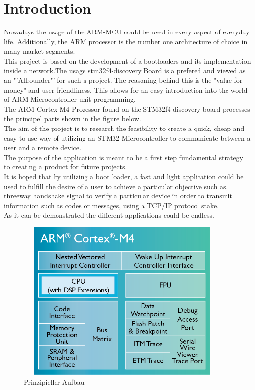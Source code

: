 \chapter{Introduction}
 
Nowadays the usage of the ARM-MCU could be used in every aspect of everyday life.
Additionally, the ARM processor is the number one architecture of choice in 
many market segments.\\ 
This project is based on the development of a bootloaders and its implementation 
inside a network.The usage stm32f4-discovery Board is a prefered and viewed as an 
"'Allrounder"' for such a project. The reasoning behind this is the "value for money" 
and user-friendliness. This allows for an easy introduction into the world of ARM
Microcontroller unit programming.\\
The ARM-Cortex-M4-Prozessor found on the STM32f4-discovery board processes 
the principel parts shown in the figure below.\\
The aim of the project is to research the feasibility to create a quick, cheap 
and easy to use way of utilizing an STM32 Microcontroller to communicate between 
a user and a remote device.\\
The purpose of the application is meant to be a first step fundamental strategy to 
creating a product for future projects.\\
It is hoped that by utilizing a boot loader, a fast and light application could 
be used to fulfill the desire of a user to achieve a particular objective such 
as, threeway handshake signal to verify a particular device in order to transmit 
information such as codes or messages, using a TCP/IP protocol stake.\\
As it can be demonstrated the different applications could be endless.\\ 

\begin{figure}[ht]
	\centering
	\includegraphics[width=400px, height=300px]{../img/Cortex-M4-chip-diagram-LG.png}
	\caption{Prinzipieller Aufbau}
	\label{m4_prinzip}
\end{figure}

